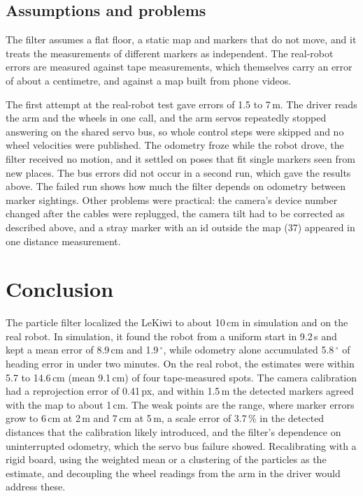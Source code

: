 \documentclass[conference]{IEEEtran}
\begin{document}
\subsection{Assumptions and problems}
The filter assumes a flat floor, a static map and markers that do not move, and it treats the measurements of different markers as independent. The real-robot errors are measured against tape measurements, which themselves carry an error of about a centimetre, and against a map built from phone videos.

The first attempt at the real-robot test gave errors of 1.5 to 7\,m. The driver reads the arm and the wheels in one call, and the arm servos repeatedly stopped answering on the shared servo bus, so whole control steps were skipped and no wheel velocities were published. The odometry froze while the robot drove, the filter received no motion, and it settled on poses that fit single markers seen from new places. The bus errors did not occur in a second run, which gave the results above. The failed run shows how much the filter depends on odometry between marker sightings. Other problems were practical: the camera's device number changed after the cables were replugged, the camera tilt had to be corrected as described above, and a stray marker with an id outside the map (37) appeared in one distance measurement.

\section{Conclusion}
\label{sec:conclusion}
The particle filter localized the LeKiwi to about 10\,cm in simulation and on the real robot. In simulation, it found the robot from a uniform start in 9.2\,s and kept a mean error of 8.9\,cm and 1.9\,$^\circ$, while odometry alone accumulated 5.8\,$^\circ$ of heading error in under two minutes. On the real robot, the estimates were within 5.7 to 14.6\,cm (mean 9.1\,cm) of four tape-measured spots. The camera calibration had a reprojection error of 0.41\,px, and within 1.5\,m the detected markers agreed with the map to about 1\,cm. The weak points are the range, where marker errors grow to 6\,cm at 2\,m and 7\,cm at 5\,m, a scale error of 3.7\,\% in the detected distances that the calibration likely introduced, and the filter's dependence on uninterrupted odometry, which the servo bus failure showed. Recalibrating with a rigid board, using the weighted mean or a clustering of the particles as the estimate, and decoupling the wheel readings from the arm in the driver would address these.
\end{document}
